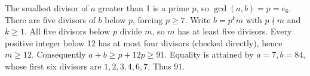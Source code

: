 The smallest divisor of $a$ greater than 1 is a prime $p$, so $\gcd(a,b)=p=e_6$. There are five divisors of $b$ below $p$, forcing $p\ge7$. Write $b=p^k m$ with $p\nmid m$ and $k\ge1$. All five divisors below $p$ divide $m$, so $m$ has at least five divisors. Every positive integer below 12 has at most four divisors (checked directly), hence $m\ge12$. Consequently $a+b\ge p+12p\ge91$. Equality is attained by $a=7,b=84$, whose first six divisors are $1,2,3,4,6,7$. Thus $\boxed{91}$.
